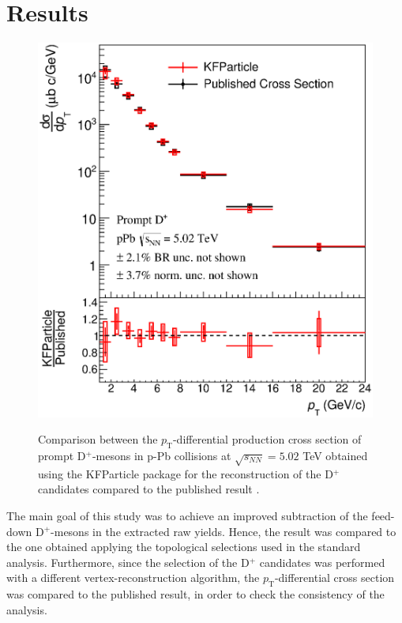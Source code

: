 \documentclass[b5paper,10pt,twoside,oldstyle,classica]{toptesi}
\newcommand{\pt}{p_\text{T}}
\begin{document}
\section{Results}
\begin{figure}[tb]
\begin{center}
{\includegraphics[scale = 0.45]{CrossSection_KF.eps}}
\caption{Comparison between the $\pt$-differential production cross section of prompt D$^+$-mesons in p-Pb collisions at $\sqrt{s_{NN}}=5.02$ TeV obtained using the KFParticle package for the reconstruction of the D$^+$ candidates compared to the published result \cite{Abelev:2014hha}.}
\label{KF_crosssection}
\end{center}
\end{figure}
The main goal of this study was to achieve an improved subtraction of the feed-down D$^+$-mesons in the extracted raw yields. Hence, the result was compared to the one obtained applying the topological selections used in the standard analysis. Furthermore, since the selection of the D$^+$ candidates was performed with a different vertex-reconstruction algorithm, the $\pt$-differential cross section was compared to the published result, in order to check the consistency of the analysis. 
\end{document}
